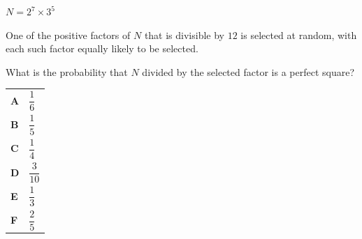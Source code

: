 \documentclass[11pt,a4paper]{article}
\begin{document}
\clearpage
\thispagestyle{djspaper}
\vspace*{8pt}
\begin{enumerate}[label=\textbf{\arabic*.},leftmargin=*,itemsep=0pt,start=8]
$N=2^7 \times 3^5$

One of the positive factors of $N$ that is divisible by $12$ is selected at random, with each such factor equally likely to be selected.

What is the probability that $N$ divided by the selected factor is a perfect square?

\par\vspace*{12pt}
\begin{tabularx}{\linewidth}{@{}>{\bfseries}l Y@{}}
A &
$\dfrac{1}{6}$
\\[0.8em]
B &
$\dfrac{1}{5}$
\\[0.8em]
C &
$\dfrac{1}{4}$
\\[0.8em]
D &
$\dfrac{3}{10}$
\\[0.8em]
E &
$\dfrac{1}{3}$
\\[0.8em]
F &
$\dfrac{2}{5}$
\\
\end{tabularx}
\end{enumerate}
\clearpage
\thispagestyle{djspaper}
\vspace*{8pt}
\end{document}
